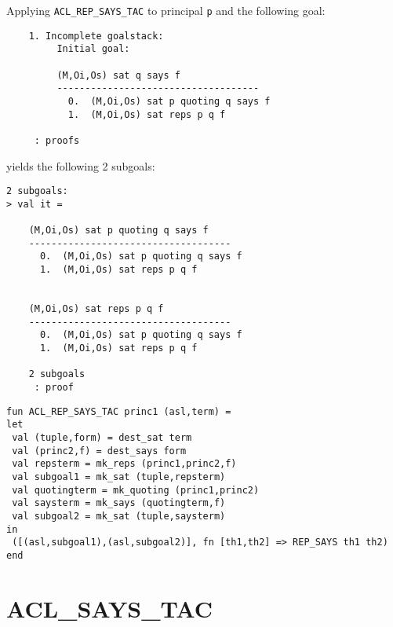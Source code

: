\EXAMPLE
Applying \texttt{ACL\_REP\_SAYS\_TAC} to principal \texttt{p} and the following goal:
\begin{holboxed}
\begin{verbatim}
    1. Incomplete goalstack:
         Initial goal:
    
         (M,Oi,Os) sat q says f
         ------------------------------------
           0.  (M,Oi,Os) sat p quoting q says f
           1.  (M,Oi,Os) sat reps p q f
    
     : proofs
\end{verbatim}
\end{holboxed}
yields the following 2 subgoals:
\begin{holboxed}
\begin{verbatim}
2 subgoals:
> val it =
    
    (M,Oi,Os) sat p quoting q says f
    ------------------------------------
      0.  (M,Oi,Os) sat p quoting q says f
      1.  (M,Oi,Os) sat reps p q f
    
    
    (M,Oi,Os) sat reps p q f
    ------------------------------------
      0.  (M,Oi,Os) sat p quoting q says f
      1.  (M,Oi,Os) sat reps p q f
    
    2 subgoals
     : proof
\end{verbatim}
\end{holboxed}

\IMPLEMENTATION
\begin{holboxed}
\begin{verbatim}
fun ACL_REP_SAYS_TAC princ1 (asl,term) =
let
 val (tuple,form) = dest_sat term
 val (princ2,f) = dest_says form
 val repsterm = mk_reps (princ1,princ2,f)
 val subgoal1 = mk_sat (tuple,repsterm)
 val quotingterm = mk_quoting (princ1,princ2)
 val saysterm = mk_says (quotingterm,f)
 val subgoal2 = mk_sat (tuple,saysterm)
in
 ([(asl,subgoal1),(asl,subgoal2)], fn [th1,th2] => REP_SAYS th1 th2)
end
\end{verbatim}
\end{holboxed}

\SEEALSO
\ENDDOC

\section{ACL\_SAYS\_TAC}



\egroup


